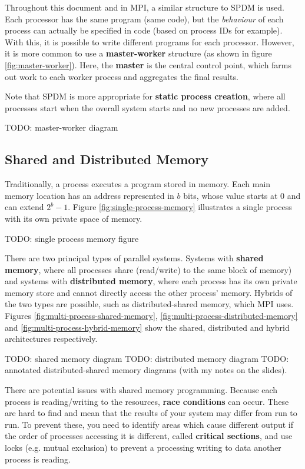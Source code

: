 \documentclass{article}
\begin{document}
Throughout this document and in MPI, a similar structure to SPDM is used. Each processor has the same program (same code), but the \textit{behaviour} of each process can actually be specified in code (based on process IDs for example).  With this, it is possible to write different programs for each processor. However, it is more common to use a \textbf{master-worker} structure (as shown in figure \ref{fig:master-worker}). Here, the \textbf{master} is the central control point, which farms out work to each worker process and aggregates the final results.

Note that SPDM is more appropriate for \textbf{static process creation}, where all processes start when the overall system starts and no new processes are added.

TODO: master-worker diagram

\subsection{Shared and Distributed Memory}

Traditionally, a process executes a program stored in memory. Each main memory location has an address represented in $b$ bits, whose value starts at 0 and can extend $2^b - 1$. Figure \ref{fig:single-process-memory} illustrates a single process with its own private space of memory.

TODO: single process memory figure

There are two principal types of parallel systems. Systems with \textbf{shared memory}, where all processes share (read/write) to the same block of memory) and systems with \textbf{distributed memory}, where each process has its own private memory store and cannot directly access the other process' memory. Hybrids of the two types are possible, such as distributed-shared memory, which MPI uses. Figures \ref{fig:multi-process-shared-memory}, \ref{fig:multi-process-distributed-memory} and \ref{fig:multi-process-hybrid-memory}  show the shared, distributed and hybrid architectures respectively.

TODO: shared memory diagram
TODO: distributed memory diagram
TODO: annotated distributed-shared memory diagrams (with my notes on the slides).

There are potential issues with shared memory programming. Because each process is reading/writing to the resources, \textbf{race conditions} can occur. These are hard to find and mean that the results of your system may differ from run to run. To prevent these, you need to identify areas which cause different output if the order of processes accessing it is different, called \textbf{critical sections}, and use locks (e.g. mutual exclusion) to prevent a processing writing to data another process is reading.
\end{document}
